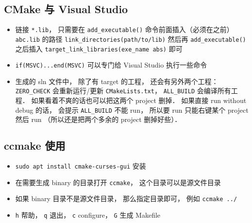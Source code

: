 \subsection{CMake 与 Visual Studio}
\begin{itemize}
\item 链接 \verb`*.lib`， 只需要在 \verb`add_executable()` 命令前面插入（必须在之前） \verb`abc.lib` 的路径 \verb`link_directories(path/to/lib)` 然后再 \verb`add_executable()` 之后插入 \verb`target_link_libraries(exe_name abs)` 即可
\item \verb`if(MSVC)...end(MSVC)` 可以专门给 Visual Studio 执行一些命令
\item 生成的 sln 文件中， 除了有 target 的工程， 还会有另外两个工程： \verb`ZERO_CHECK` 会重新运行/更新 \verb`CMakeLists.txt`， \verb`ALL_BUILD` 会编译所有工程． 如果看着不爽的话也可以把这两个 project 删掉． 如果直接 run without debug 的话， 会提示 \verb`ALL_BUILD` 不能 run， 所以要 run 只能右键某个 project 然后 run （所以还是把两个多余的 project 删掉好些）．
\end{itemize}

\subsection{ccmake 使用}
\begin{itemize}
\item \verb`sudo apt install cmake-curses-gui` 安装
\item 在需要生成 binary 的目录打开 \verb`ccmake`， 这个目录可以是源文件目录
\item 如果 binary 目录不是源文件目录， 那么指定目录即可， 例如 \verb`ccmake ../`
\item \verb`h` 帮助， \verb`q` 退出， \verb`c` configure， \verb`G` 生成 Makefile
\end{itemize}

